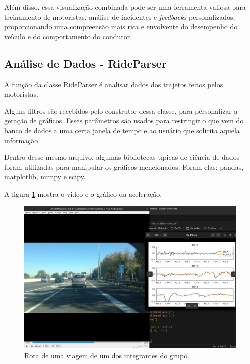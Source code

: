     Além disso, essa visualização combinada pode ser uma ferramenta valiosa para treinamento de motoristas, análise de incidentes e \textit{feedbacks} personalizados, proporcionando uma compreensão mais rica e envolvente do desempenho do veículo e do comportamento do condutor.

    \subsection{Análise de Dados - RideParser}

    A função da classe RideParser é analisar dados dos trajetos feitos pelos motoristas. 
    
    Alguns filtros são recebidos pelo construtor dessa classe, para personalizar a geração de gráficos. Esses parâmetros são usados para restringir o que vem do banco de dados a uma certa janela de tempo e ao usuário que solicita aquela informação.
    
    Dentro desse mesmo arquivo, algumas bibliotecas típicas de ciência de dados foram utilizadas para manipular os gráficos mencionados. Foram elas: pandas, matplotlib, numpy e scipy.
    
    A figura \ref{fig:rota1integrante} mostra o video e o gráfico da aceleração.
    
    \begin{figure}[hp]
        \centering
        
        \includegraphics[scale=0.3]{figures/rota_integrante.jpg}
        
        \caption{Rota de uma viagem de um dos integrantes do grupo.}
        \label{fig:rota1integrante}
    \end{figure}

